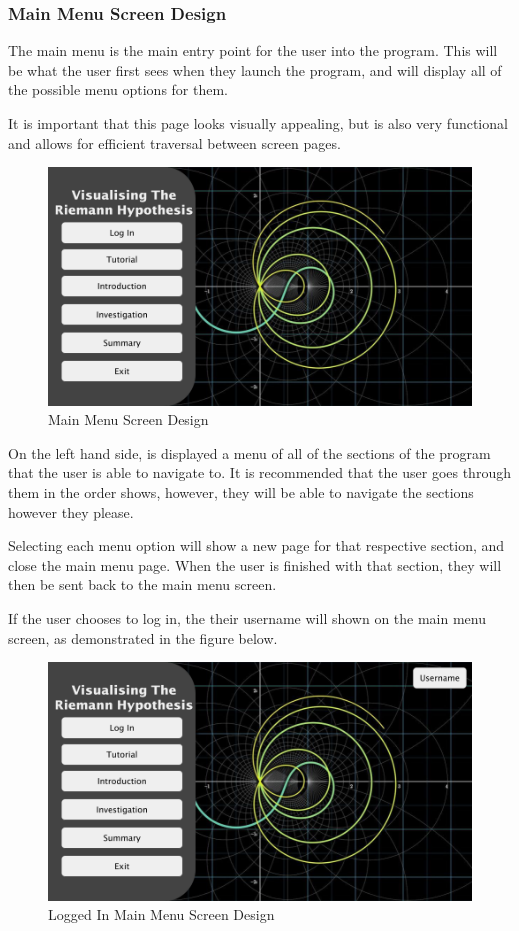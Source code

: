 \documentclass{article}
\begin{document}
\clearpage
\subsubsection{Main Menu Screen Design}

The main menu is the main entry point for the user into the program. This will be what the user first sees when they launch the program, and will display all of the possible menu options for them.

It is important that this page looks visually appealing, but is also very functional and allows for efficient traversal between screen pages.

\begin{figure}[ht]
    \centering
    \includegraphics[scale=0.2]{main-menu-screen-design}
    \caption{Main Menu Screen Design}
\end{figure}

On the left hand side, is displayed a menu of all of the sections of the program that the user is able to navigate to. It is recommended that the user goes through them in the order shows, however, they will be able to navigate the sections however they please.

Selecting each menu option will show a new page for that respective section, and close the main menu page. When the user is finished with that section, they will then be sent back to the main menu screen.

If the user chooses to log in, the their username will shown on the main menu screen, as demonstrated in the figure below.

\begin{figure}[h]
    \centering
    \includegraphics[scale=0.2]{main-menu-logged-in-screen-design}
    \caption{Logged In Main Menu Screen Design}
\end{figure}
\end{document}
